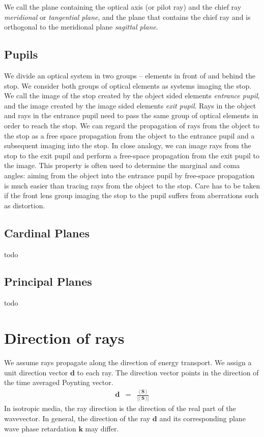 \documentclass[12pt,a4paper,twoside,openright,BCOR10mm,headsepline,titlepage,abstracton,chapterprefix,final]{scrreprt}
\newcommand\Vector[1]{{\mathbf{#1}}}
\newcommand{\timeavg}[1]{{\langle\,#1\,\rangle}}
\begin{document}
We call the plane containing the optical axis (or pilot ray) and the chief ray \emph{meridional} or \emph{tangential plane}, 
and the plane that contains the chief ray and is orthogonal to the meridional plane \emph{sagittal plane}.

\subsection{Pupils}
We divide an optical system in two groups -- elements in front of and behind the stop. 
We consider both groups of optical elements as systems imaging the stop.
We call the image of the stop created by the object sided elements \emph{entrance pupil}, and the image created by the image sided elements \emph{exit pupil}.
Rays in the object and rays in the entrance pupil need to pass the same group of optical elements in order to reach the stop. 
We can regard the propagation of rays from the object to the stop as a free space propagation from the object to the entrance pupil and a subsequent imaging into the stop.
In close analogy, we can image rays from the stop to the exit pupil and perform a free-space propagation from the exit pupil to the image.
This property is often used to determine the marginal and coma angles: 
aiming from the object into the entrance pupil by free-space propagation is much easier than tracing rays from the object to the stop.
Care has to be taken if the front lens group imaging the stop to the pupil suffers from aberrations such as distortion.

\subsection{Cardinal Planes}
todo

\subsection{Principal Planes}
todo


\section{Direction of rays} \label{sec:raydir}
We assume rays propagate along the direction of energy transport.
We assign a unit direction vector $\Vector{d}$ to each ray.
The direction vector points in the direction of the time averaged Poynting vector.
\begin{eqnarray}
 \Vector{d} &=& \frac{\timeavg{\Vector{S}}}{|\timeavg{\Vector{S}}|}
\end{eqnarray}
In isotropic media, the ray direction is the direction of the real part of the wavevector.
In general, the direction of the ray $\Vector{d}$ and its corresponding plane wave phase retardation $\Vector{k}$ may differ.
\end{document}

